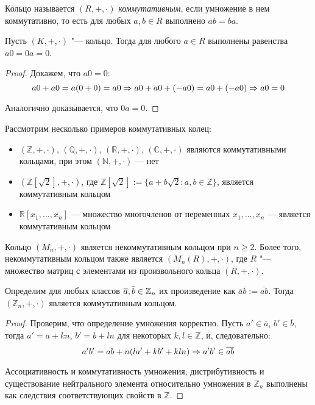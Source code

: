 \begin{definition}
	Кольцо называется $(R, +, \cdot)$ \textit{коммутативным}, если умножение в нем коммутативно, то есть для любых $a, b \in R$ выполнено $ab = ba$.
\end{definition}

\begin{proposition}
	Пусть $(K, +, \cdot)$ "--- кольцо. Тогда для любого $a \in R$ выполнены равенства $a0 = 0a = 0$.
\end{proposition}

\begin{proof}
	Докажем, что $a0 = 0$:
	\[a0 + a0 = a(0 + 0) = a0 \Rightarrow a0 + a0 + (-a0) = a0 + (-a0) \Rightarrow a0 = 0\]
	
	Аналогично доказывается, что $0a = 0$.
\end{proof}

\begin{example}
	Рассмотрим несколько примеров коммутативных колец:
	\begin{itemize}
		\item $(\mathbb{Z}, +, \cdot)$, $(\mathbb{Q}, +, \cdot)$, $(\mathbb{R}, +, \cdot)$, $(\mathbb{C}, +, \cdot)$ являются коммутативными кольцами, при этом $(\mathbb{N}, +, \cdot)$ --- нет
		\item $(\mathbb{Z}[\sqrt{2}], +, \cdot)$, где $\mathbb{Z}[\sqrt{2}] := \{a + b\sqrt{2}: a, b \in \mathbb{Z}\}$, является коммутативным кольцом
		\item $\mathbb{R}[x_1, \dotsc, x_n]$ --- множество многочленов от переменных $x_1, \dotsc, x_n$ --- является коммутативным кольцом
	\end{itemize}
\end{example}

\begin{example}
	Кольцо $(M_n, +, \cdot)$ является некоммутативным кольцом при $n \ge 2$. Более того, некоммутативным кольцом также является $(M_n(R), +, \cdot)$, где $R$ "--- множество матриц с элементами из произвольного кольца $(R, +, \cdot)$.
\end{example}

\begin{proposition}
	Определим для любых классов $\overline a, \overline b \in \mathbb{Z}_n$ их произведение как $\overline{a}\overline{b} := \overline{ab}$. Тогда $(\mathbb{Z}_n, +, \cdot)$ является коммутативным кольцом.
\end{proposition}

\begin{proof}
	Проверим, что определение умножения корректно. Пусть $a' \in \overline{a}$, $b' \in \overline{b}$, тогда $a' = a + kn$, $b' = b + ln$ для некоторых $k, l \in \mathbb{Z}$, и, следовательно:
	\[a'b' = ab + n(la' + kb' + kln) \Rightarrow a'b' \in \overline{ab}\]
	
	Ассоциативность и коммутативность умножения, дистрибутивность и существование нейтрального элемента относительно умножения в $\mathbb{Z}_n$ выполнены как следствия соответствующих свойств в $\mathbb{Z}$.
\end{proof}

